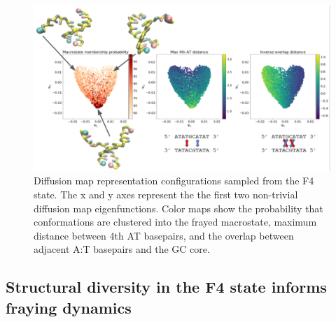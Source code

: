 \documentclass[journal=jpcbfk,manuscript=article]{achemso}
\begin{document}
\begin{figure}[ht!]
	\begin{center}
        \includegraphics[width=450, scale=1]{Fig8.pdf}
        \caption{Diffusion map representation configurations sampled from the F4 state. The x and y axes represent the the first two non-trivial diffusion map eigenfunctions. Color maps show the probability that conformations are clustered into the frayed macrostate, maximum distance between 4th AT basepairs, and the overlap between adjacent A:T basepairs and the GC core.}
        \label{fig:GC-core_dmaps}
	\end{center}
\end{figure}

\subsection{Structural diversity in the F4 state informs fraying dynamics}  %
\end{document}
